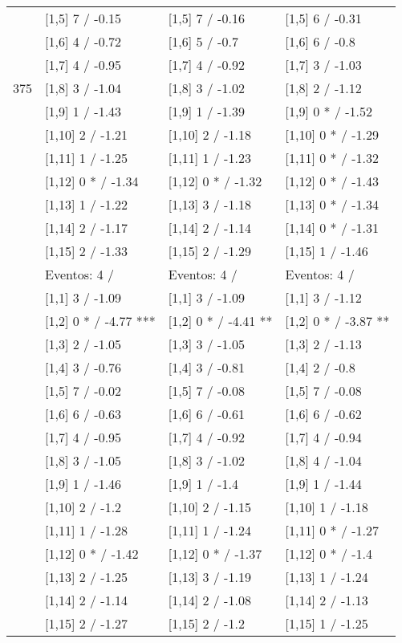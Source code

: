 \begin{table}
\begin{tabular}[t]{llll}
 & {}[1,5] 7  / -0.15 & {}[1,5] 7  / -0.16 & {}[1,5] 6  / -0.31\\
 & {}[1,6] 4  / -0.72 & {}[1,6] 5  / -0.7 & {}[1,6] 6  / -0.8\\
 & {}[1,7] 4  / -0.95 & {}[1,7] 4  / -0.92 & {}[1,7] 3  / -1.03\\
375 & {}[1,8] 3  / -1.04 & {}[1,8] 3  / -1.02 & {}[1,8] 2  / -1.12\\
\addlinespace
 & {}[1,9] 1  / -1.43 & {}[1,9] 1  / -1.39 & {}[1,9] 0 * / -1.52\\
 & {}[1,10] 2  / -1.21 & {}[1,10] 2  / -1.18 & {}[1,10] 0 * / -1.29\\
 & {}[1,11] 1  / -1.25 & {}[1,11] 1  / -1.23 & {}[1,11] 0 * / -1.32\\
 & {}[1,12] 0 * / -1.34 & {}[1,12] 0 * / -1.32 & {}[1,12] 0 * / -1.43\\
 & {}[1,13] 1  / -1.22 & {}[1,13] 3  / -1.18 & {}[1,13] 0 * / -1.34\\
\addlinespace
 & {}[1,14] 2  / -1.17 & {}[1,14] 2  / -1.14 & {}[1,14] 0 * / -1.31\\
 & {}[1,15] 2  / -1.33 & {}[1,15] 2  / -1.29 & {}[1,15] 1  / -1.46\\
 & Eventos:  4 / & Eventos:  4 / & Eventos:  4 /\\
 & {}[1,1] 3  / -1.09 & {}[1,1] 3  / -1.09 & {}[1,1] 3  / -1.12\\
 & {}[1,2] 0 * / -4.77 *** & {}[1,2] 0 * / -4.41 ** & {}[1,2] 0 * / -3.87 **\\
\addlinespace
 & {}[1,3] 2  / -1.05 & {}[1,3] 3  / -1.05 & {}[1,3] 2  / -1.13\\
 & {}[1,4] 3  / -0.76 & {}[1,4] 3  / -0.81 & {}[1,4] 2  / -0.8\\
 & {}[1,5] 7  / -0.02 & {}[1,5] 7  / -0.08 & {}[1,5] 7  / -0.08\\
 & {}[1,6] 6  / -0.63 & {}[1,6] 6  / -0.61 & {}[1,6] 6  / -0.62\\
 & {}[1,7] 4  / -0.95 & {}[1,7] 4  / -0.92 & {}[1,7] 4  / -0.94\\
\addlinespace
500 & {}[1,8] 3  / -1.05 & {}[1,8] 3  / -1.02 & {}[1,8] 4  / -1.04\\
 & {}[1,9] 1  / -1.46 & {}[1,9] 1  / -1.4 & {}[1,9] 1  / -1.44\\
 & {}[1,10] 2  / -1.2 & {}[1,10] 2  / -1.15 & {}[1,10] 1  / -1.18\\
 & {}[1,11] 1  / -1.28 & {}[1,11] 1  / -1.24 & {}[1,11] 0 * / -1.27\\
 & {}[1,12] 0 * / -1.42 & {}[1,12] 0 * / -1.37 & {}[1,12] 0 * / -1.4\\
\addlinespace
 & {}[1,13] 2  / -1.25 & {}[1,13] 3  / -1.19 & {}[1,13] 1  / -1.24\\
 & {}[1,14] 2  / -1.14 & {}[1,14] 2  / -1.08 & {}[1,14] 2  / -1.13\\
 & {}[1,15] 2  / -1.27 & {}[1,15] 2  / -1.2 & {}[1,15] 1  / -1.25\\
\bottomrule
\end{tabular}
\end{table}
